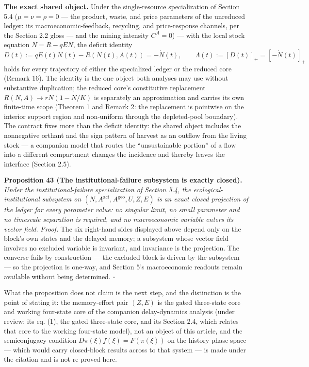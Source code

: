 \documentclass[11pt]{article}
\begin{document}
\textbf{The exact shared object.} Under the single-resource
specialization of Section 5.4 (\(\mu = \nu = \rho = 0\) --- the product,
waste, and price parameters of the unreduced ledger: its
macroeconomic-feedback, recycling, and price-response channels, per the
Section 2.2 gloss --- and the mining intensity \(C^A = 0\)) --- with the
local stock equation \(\dot N = R - qEN\), the deficit identity
\[D(t) := qE(t)N(t) - R(N(t), A(t)) = -\dot N(t), \qquad \Lambda(t) := [D(t)]_+ = [-\dot N(t)]_+\]
holds for every trajectory of either the specialized ledger or the
reduced core (Remark 16). The identity is the one object both analyses
may use without substantive duplication; the reduced core's constitutive
replacement \(R(N,A) \to rN(1 - N/K)\) is separately an approximation
and carries its own finite-time scope (Theorem 1 and Remark 2: the
replacement is pointwise on the interior support region and non-uniform
through the depleted-pool boundary). The contract fixes more than the
deficit identity: the shared object includes the nonnegative orthant and
the sign pattern of harvest as an outflow from the living stock --- a
companion model that routes the ``unsustainable portion'' of a flow into
a different compartment changes the incidence and thereby leaves the
interface (Section 2.5).

\textbf{Proposition 43 (The institutional-failure subsystem is exactly closed).} \emph{Under the institutional-failure
specialization of Section 5.4, the ecological-institutional subsystem on \((N, A^{\mathrm{act}}, A^{\mathrm{geo}}, U, Z, E)\) is an exact closed projection of the ledger for every parameter value: no singular limit, no small
parameter and no timescale separation is required, and no macroeconomic variable enters its vector field.}
\emph{Proof.} The six right-hand sides displayed above depend only on the block's own states and the delayed memory; a
subsystem whose vector field involves no excluded variable is invariant, and invariance is the projection. The
converse fails by construction --- the excluded block is driven by the subsystem --- so the projection is
one-way, and Section 5's macroeconomic readouts remain available without being determined. \(\square\)

What the proposition does not claim is the next step, and the distinction is the point of stating it: the
memory-effort pair \((Z, E)\) is the gated three-state core and working four-state core of the companion
delay-dynamics analysis (under review; its eq. (1), the gated three-state core, and its Section 2.4, which
relates that core to the working four-state model), not an object of this article, and the semiconjugacy
condition \(D\pi(\xi) f(\xi) = F(\pi(\xi))\) on the history phase space --- which would carry closed-block
results across to that system --- is made under the citation and is not re-proved here.
\end{document}
